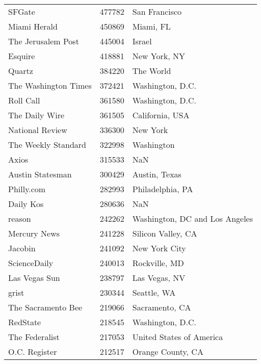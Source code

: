 \begin{longtable}{lrl}
	SFGate &     477782 &                         San Francisco \\
	Miami Herald &     450869 &                             Miami, FL \\
	The Jerusalem Post &     445004 &                                Israel \\
	Esquire &     418881 &                          New York, NY \\
	Quartz &     384220 &                             The World \\
	The Washington Times &     372421 &                      Washington, D.C. \\
	Roll Call &     361580 &                      Washington, D.C. \\
	The Daily Wire &     361505 &                       California, USA \\
	National Review &     336300 &                              New York \\
	The Weekly Standard &     322998 &                            Washington \\
	Axios &     315533 &                                   NaN \\
	Austin Statesman &     300429 &                         Austin, Texas \\
	Philly.com &     282993 &                      Philadelphia, PA \\
	Daily Kos &     280636 &                                   NaN \\
	reason &     242262 &        Washington, DC and Los Angeles \\
	Mercury News &     241228 &                    Silicon Valley, CA \\
	Jacobin &     241092 &                         New York City \\
	ScienceDaily &     240013 &                         Rockville, MD \\
	Las Vegas Sun &     238797 &                         Las Vegas, NV \\
	grist &     230344 &                           Seattle, WA \\
	The Sacramento Bee &     219066 &                        Sacramento, CA \\
	RedState &     218545 &                      Washington, D.C. \\
	The Federalist &     217053 &              United States of America \\
	O.C. Register &     212517 &                     Orange County, CA \\

\end{longtable}
